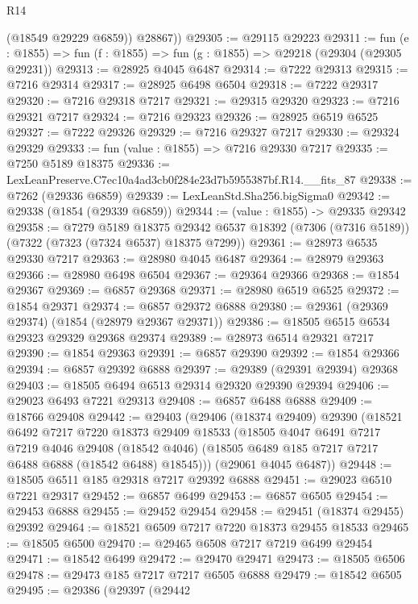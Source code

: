\begin{lexlean}{R14}
\begin{coremodule}
          (@18549 @29229 @6859))
        @28867))
@29305 := @29115 @29223
@29311 := fun (e : @1855) => fun (f : @1855) => fun (g : @1855) => @29218 (@29304 (@29305 @29231))
@29313 := @28925 @4045 @6487
@29314 := @7222 @29313
@29315 := @7216 @29314
@29317 := @28925 @6498 @6504
@29318 := @7222 @29317
@29320 := @7216 @29318 @7217
@29321 := @29315 @29320
@29323 := @7216 @29321 @7217
@29324 := @7216 @29323
@29326 := @28925 @6519 @6525
@29327 := @7222 @29326
@29329 := @7216 @29327 @7217
@29330 := @29324 @29329
@29333 := fun (value : @1855) => @7216 @29330 @7217
@29335 := @7250 @5189 @18375
@29336 := LexLeanPreserve.C7ec10a4ad3cb0f284e23d7b5955387bf.R14.__fits_87
@29338 := @7262 (@29336 @6859)
@29339 := LexLeanStd.Sha256.bigSigma0
@29342 := @29338 (@1854 (@29339 @6859))
@29344 := (value : @1855) -> @29335 @29342
@29358 := @7279
    @5189
    @18375
    @29342
    @6537
    @18392
    (@7306 (@7316 @5189))
    (@7322 (@7323 (@7324 @6537) @18375 @7299))
@29361 := @28973 @6535 @29330 @7217
@29363 := @28980 @4045 @6487
@29364 := @28979 @29363
@29366 := @28980 @6498 @6504
@29367 := @29364 @29366
@29368 := @1854 @29367
@29369 := @6857 @29368
@29371 := @28980 @6519 @6525
@29372 := @1854 @29371
@29374 := @6857 @29372 @6888
@29380 := @29361 (@29369 @29374) (@1854 (@28979 @29367 @29371))
@29386 := @18505 @6515 @6534 @29323 @29329 @29368 @29374
@29389 := @28973 @6514 @29321 @7217
@29390 := @1854 @29363
@29391 := @6857 @29390
@29392 := @1854 @29366
@29394 := @6857 @29392 @6888
@29397 := @29389 (@29391 @29394) @29368
@29403 := @18505 @6494 @6513 @29314 @29320 @29390 @29394
@29406 := @29023 @6493 @7221 @29313
@29408 := @6857 @6488 @6888
@29409 := @18766 @29408
@29442 := @29403
    (@29406
      (@18374 @29409)
      @29390
      (@18521
        @6492
        @7217
        @7220
        @18373
        @29409
        @18533
        (@18505
          @4047
          @6491
          @7217
          @7219
          @4046
          @29408
          (@18542 @4046)
          (@18505 @6489 @185 @7217 @7217 @6488 @6888 (@18542 @6488) @18545)))
      (@29061 @4045 @6487))
@29448 := @18505 @6511 @185 @29318 @7217 @29392 @6888
@29451 := @29023 @6510 @7221 @29317
@29452 := @6857 @6499
@29453 := @6857 @6505
@29454 := @29453 @6888
@29455 := @29452 @29454
@29458 := @29451 (@18374 @29455) @29392
@29464 := @18521 @6509 @7217 @7220 @18373 @29455 @18533
@29465 := @18505 @6500
@29470 := @29465 @6508 @7217 @7219 @6499 @29454
@29471 := @18542 @6499
@29472 := @29470 @29471
@29473 := @18505 @6506
@29478 := @29473 @185 @7217 @7217 @6505 @6888
@29479 := @18542 @6505
@29495 := @29386
    (@29397
      (@29442

\end{coremodule}
\end{lexlean}
